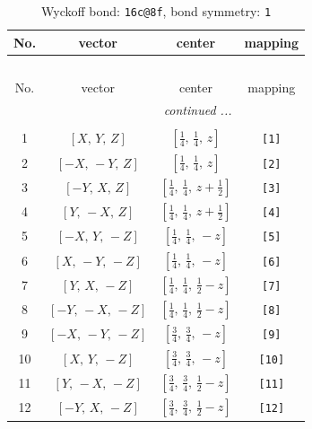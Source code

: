 \documentclass[fleqn,8pt]{jsarticle}
\begin{document}
\begin{longtable}{cccc}
\caption{Wyckoff bond: {\tt 16c@8f}, bond symmetry: {\tt 1}}
 \\
 \hline \hline
No. & vector & center & mapping \\ \hline \endfirsthead

\multicolumn{3}{l}{\tablename\ \thetable{}} \\
 \hline \hline
No. & vector & center & mapping \\ \hline \endhead

 \hline \hline
\multicolumn{3}{r}{\footnotesize\it continued ...} \\ \endfoot

 \hline \hline
\multicolumn{3}{r}{} \\ \endlastfoot

1 & $\left[ X,\, Y,\, Z \right]$ & $\left[ \frac{1}{4},\, \frac{1}{4},\, z \right]$ & {\tt [1]} \\ \hline
2 & $\left[ - X,\, - Y,\, Z \right]$ & $\left[ \frac{1}{4},\, \frac{1}{4},\, z \right]$ & {\tt [2]} \\ \hline
3 & $\left[ - Y,\, X,\, Z \right]$ & $\left[ \frac{1}{4},\, \frac{1}{4},\, z + \frac{1}{2} \right]$ & {\tt [3]} \\ \hline
4 & $\left[ Y,\, - X,\, Z \right]$ & $\left[ \frac{1}{4},\, \frac{1}{4},\, z + \frac{1}{2} \right]$ & {\tt [4]} \\ \hline
5 & $\left[ - X,\, Y,\, - Z \right]$ & $\left[ \frac{1}{4},\, \frac{1}{4},\, - z \right]$ & {\tt [5]} \\ \hline
6 & $\left[ X,\, - Y,\, - Z \right]$ & $\left[ \frac{1}{4},\, \frac{1}{4},\, - z \right]$ & {\tt [6]} \\ \hline
7 & $\left[ Y,\, X,\, - Z \right]$ & $\left[ \frac{1}{4},\, \frac{1}{4},\, \frac{1}{2} - z \right]$ & {\tt [7]} \\ \hline
8 & $\left[ - Y,\, - X,\, - Z \right]$ & $\left[ \frac{1}{4},\, \frac{1}{4},\, \frac{1}{2} - z \right]$ & {\tt [8]} \\ \hline
9 & $\left[ - X,\, - Y,\, - Z \right]$ & $\left[ \frac{3}{4},\, \frac{3}{4},\, - z \right]$ & {\tt [9]} \\ \hline
10 & $\left[ X,\, Y,\, - Z \right]$ & $\left[ \frac{3}{4},\, \frac{3}{4},\, - z \right]$ & {\tt [10]} \\ \hline
11 & $\left[ Y,\, - X,\, - Z \right]$ & $\left[ \frac{3}{4},\, \frac{3}{4},\, \frac{1}{2} - z \right]$ & {\tt [11]} \\ \hline
12 & $\left[ - Y,\, X,\, - Z \right]$ & $\left[ \frac{3}{4},\, \frac{3}{4},\, \frac{1}{2} - z \right]$ & {\tt [12]} \\ \hline

\end{longtable}
\end{document}
